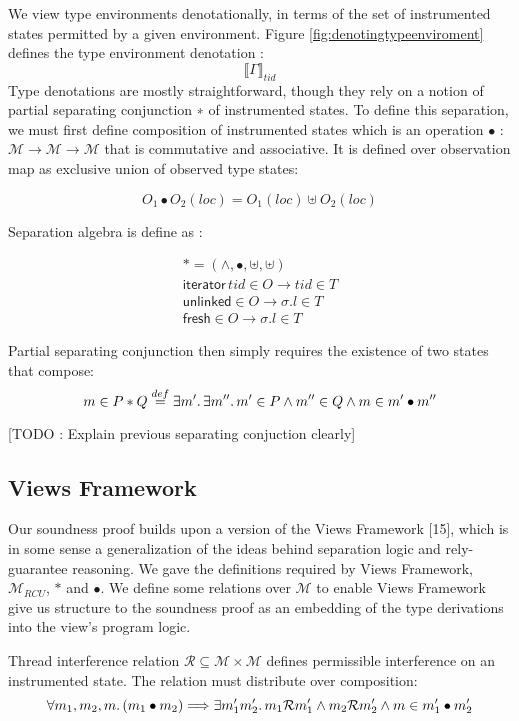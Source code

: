 We view type environments denotationally, in terms of the set of instrumented states permitted by a given environment. Figure \ref{fig:denotingtypeenviroment} defines the type environment denotation :
\[ \llbracket \Gamma  \rrbracket_{tid} \] 
Type denotations are mostly straightforward, though they rely on a notion of partial separating conjunction ∗ of instrumented states. To define this separation, we must first define composition of instrumented states which is an operation $\bullet$ : $\mathcal{M} \longrightarrow \mathcal{M} \longrightarrow \mathcal{M}$ that is commutative and associative. It is defined over observation map as exclusive union of observed type states:

\[O_{1} \bullet O_{2}(loc) =  O_{1}(loc) \uplus O_{2}(loc)\]

Separation algebra is define as :

\begin{gather}
 * = ( \land,\bullet,\uplus,\uplus) 
\\
\textsf{iterator} \, tid \in O \rightarrow tid \in T
\\
\textsf{unlinked} \in O \rightarrow \sigma.l \in T
\\
\textsf{fresh} \in O \rightarrow \sigma.l \in T
\end{gather}

Partial separating conjunction then simply requires the existence of two states that compose:
\[ m \in P \ast Q   \stackrel{def}{=} \exists m' \ldotp \exists m'' \ldotp m' \in P \land m'' \in Q \land m \in m' \bullet m''  \]

[TODO : Explain previous separating conjuction clearly]

\subsection{Views Framework}
Our soundness proof builds upon a version of the Views Framework [15], which is in some sense a generalization of the ideas behind separation logic and rely-guarantee reasoning. We gave the definitions required by Views Framework, $\mathcal{M}_{RCU}$, $*$ and $\bullet$. We define some relations over $\mathcal{M}$ to enable Views Framework give us structure to the soundness proof as an embedding of the type derivations into the view's program logic.

Thread interference relation $\mathcal{R} \subseteq \mathcal{M} \times \mathcal{M}$  defines permissible interference on an instrumented state. The relation must distribute over composition:
\[
   \forall m_{1}, m_{2}, m\ldotp (m_{1} \bullet  m_{2}) \Longrightarrow \exists  m'_{1} m'_{2} \ldotp m_{1} \mathcal{R} m'_{1} \land m_{2} \mathcal{R} m'_{2} \land m \in m'_{1} \bullet m'_{2}
\]

